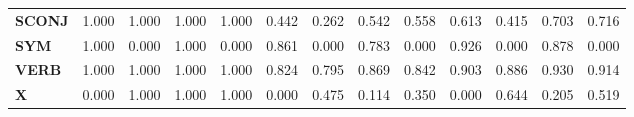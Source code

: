 \begin{table}
\begin{tabular}{|l||l||l||l||l||l||l||l||l||l||l||l||l|}
\textbf{SCONJ} & 1.000 & 1.000 & 1.000 & 1.000 & 0.442 & 0.262 & 0.542 & 0.558 & 0.613 & 0.415 & 0.703 & 0.716 \\
\textbf{SYM} & 1.000 & 0.000 & 1.000 & 0.000 & 0.861 & 0.000 & 0.783 & 0.000 & 0.926 & 0.000 & 0.878 & 0.000 \\
\textbf{VERB} & 1.000 & 1.000 & 1.000 & 1.000 & 0.824 & 0.795 & 0.869 & 0.842 & 0.903 & 0.886 & 0.930 & 0.914 \\
\textbf{X} & 0.000 & 1.000 & 1.000 & 1.000 & 0.000 & 0.475 & 0.114 & 0.350 & 0.000 & 0.644 & 0.205 & 0.519 \\
\bottomrule
\end{tabular}
\end{table}
